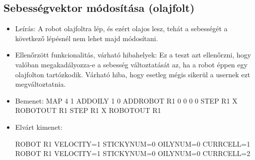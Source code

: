 \subsection{Sebességvektor módosítása (olajfolt)}
\begin{itemize}
	\item Leírás: \newline
	A robot olajfoltra lép, és ezért olajos lesz, tehát a sebességét a következő lépésnél nem lehet majd módosítani.
	\item Ellenőrzött funkcionalitás, várható hibahelyek: \newline 
	Ez a teszt azt ellenőrzni, hogy valóban megakadályozza-e a sebesség változtatását az, ha a robot éppen egy olajfolton tartózkodik. Várható hiba, hogy esetleg mégis sikerül a usernek ezt megváltoztatnia.
	\item Bemenet: \newline
		MAP 4 1 \newline
		ADDOILY 1 0 \newline
		ADDROBOT R1 0 0 0 0 \newline
		STEP R1 X \newline
		ROBOTOUT R1 \newline
		STEP R1 X \newline
		ROBOTOUT R1 \newline
	\item Elvárt kimenet: \newline
	
		ROBOT R1 VELOCITY=1 STICKYNUM=0 OILYNUM=0 CURRCELL=1 \newline
		ROBOT R1 VELOCITY=1 STICKYNUM=0 OILYNUM=0 CURRCELL=2 \newline
		
\end{itemize}

